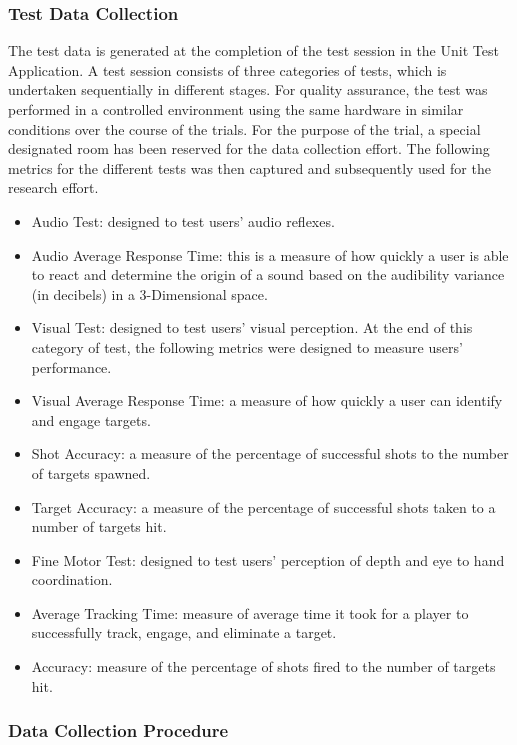 \subsubsection*{Test Data Collection}
The test data is generated at the completion of the test session in the Unit Test Application. A test session consists of three categories of tests, which is undertaken sequentially in different stages. 
For quality assurance, the test was performed in a controlled environment using the same hardware in similar conditions over the course of the trials. For the purpose of the trial, a special designated room
has been reserved for the data collection effort. The following metrics for the different tests was then captured and subsequently used for the research effort.

\begin{itemize}
    \item Audio Test: designed to test users’ audio reflexes. 
    \item Audio Average Response Time: this is a measure of how quickly a user is able to react and determine the origin of a sound based on the audibility variance (in decibels) in a 3-Dimensional space. 
    \item Visual Test: designed to test users’ visual perception. At the end of this category of test, the following metrics were designed to measure users’ performance. 
    \item Visual Average Response Time: a measure of how quickly a user can identify and engage targets. 
    \item Shot Accuracy: a measure of the percentage of successful shots to the number of targets spawned. 
    \item Target Accuracy: a measure of the percentage of successful shots taken to a number of targets hit. 
    \item Fine Motor Test: designed to test users’ perception of depth and eye to hand coordination. 
    \item Average Tracking Time: measure of average time it took for a player to successfully track, engage, and eliminate a target.
    \item Accuracy: measure of the percentage of shots fired to the number of targets hit. 
\end{itemize}

\subsubsection{Data Collection Procedure}

